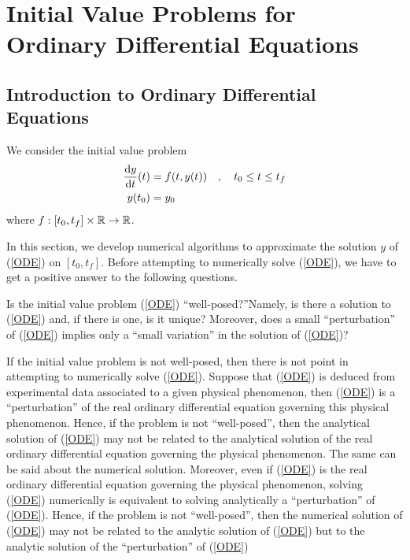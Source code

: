 \chapter[Initial Value Problems]{Initial Value Problems for Ordinary Differential Equations}
\label{chaptInitVal}

\section{Introduction to Ordinary Differential Equations}

We consider the initial value problem
\begin{equation} \label{ODE}
\begin{split}
\frac{\mathrm{d}y}{\mathrm{d}{t}}(t) &= f(t,y(t)) \quad,\quad t_0 \leq t \leq t_f \\
y(t_0) & = y_0
\end{split}
\end{equation}
where $f:[t_0,t_f]\times\mathbb{R} \rightarrow \mathbb{R}$.

In this section, we develop numerical algorithms to approximate the
solution $y$ of (\ref{ODE}) on $[t_0,t_f]$.  Before attempting to
numerically solve (\ref{ODE}), we have to get a positive answer to the
following questions.

\begin{Quest*}
Is the initial value problem (\ref{ODE})
``well-posed?''\quad Namely, is there a solution to (\ref{ODE}) and, if
there is one, is it unique?  Moreover, does a small ``perturbation''
of (\ref{ODE}) implies only a ``small variation'' in the solution of
(\ref{ODE})?
\end{Quest*}

If the initial value problem is not well-posed, then there is not
point in attempting to numerically solve (\ref{ODE}).  Suppose that
(\ref{ODE}) is deduced from experimental data associated to a given
physical phenomenon, then (\ref{ODE}) is a ``perturbation'' of the
real ordinary differential equation governing this physical
phenomenon.  Hence, if the problem is not ``well-posed'', then the
analytical solution of (\ref{ODE}) may not be related
to the analytical solution of the real ordinary differential equation
governing the physical phenomenon.  The same can be said about the
numerical solution.  Moreover, even if (\ref{ODE}) is
the real ordinary differential equation governing the physical
phenomenon, solving (\ref{ODE}) numerically is equivalent to solving
analytically a ``perturbation'' of (\ref{ODE}).  Hence, if the problem
is not ``well-posed'', then the numerical solution of (\ref{ODE}) may
not be related to the analytic solution of (\ref{ODE}) but to the
analytic solution of the ``perturbation'' of (\ref{ODE})

